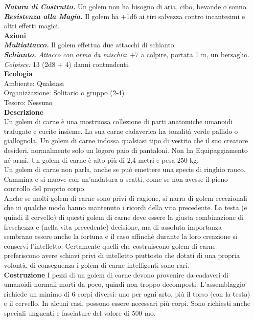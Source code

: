 \begin{multicols}{2}
\emph{\textbf{Natura di Costrutto.}} Un golem non ha bisogno di aria, cibo, bevande o sonno.\\
\emph{\textbf{Resistenza alla Magia.}} Il golem ha +1d6 ai tiri salvezza contro incantesimi e altri effetti magici.\\
\smallskip\textbf{Azioni}\\
\emph{\textbf{Multiattacco.}} Il golem effettua due attacchi di schianto.\\
\emph{\textbf{Schianto.} Attacco con arma da mischia}: +7 a colpire, portata 1 m, un bersaglio.\\
\emph{Colpisce:} 13 (2d8 + 4) danni contundenti.\\
\textbf{Ecologia}\\
Ambiente: Qualsiasi\\
Organizzazione: Solitario o gruppo (2-4)\\
Tesoro: Nessuno\\
\textbf{Descrizione}\\
Un golem di carne è una mostruosa collezione di parti anatomiche umanoidi trafugate e cucite insieme. La sua carne cadaverica ha tonalità verde pallido o giallognola. Un golem di carne indossa qualsiasi tipo di vestito che il suo creatore desideri, normalmente solo un logoro paio di pantaloni. Non ha Equipaggiamento né armi. Un golem di carne è alto più di 2,4 metri e pesa 250 kg.\\

Un golem di carne non parla, anche se può emettere una specie di ringhio rauco. Cammina e si muove con un’andatura a scatti, come se non avesse il pieno controllo del proprio corpo.\\

Anche se molti golem di carne sono privi di ragione, si narra di golem eccezionali che in qualche modo hanno mantenuto i ricordi della vita precedente. La testa (e quindi il cervello) di questi golem di carne deve essere la giusta combinazione di freschezza e (nella vita precedente) decisione, ma di assoluta importanza sembrano essere anche la fortuna e il caso affinchè durante la loro creazione si conservi l’intelletto. Certamente quelli che costruiscono golem di carne preferiscono avere schiavi privi di intelletto piuttosto che dotati di una propria volontà, di conseguenza i golem di carne intelligenti sono rari.\\

\textbf{Costruzione}
I pezzi di un golem di carne devono provenire da cadaveri di umanoidi normali morti da poco, quindi non troppo decomposti. L’assemblaggio richiede un minimo di 6 corpi diversi: uno per ogni arto, più il torso (con la testa) e il cervello. In alcuni casi, possono essere necessari più corpi. Sono richiesti anche speciali unguenti e fasciature del valore di 500 mo.\\


\end{multicols}
